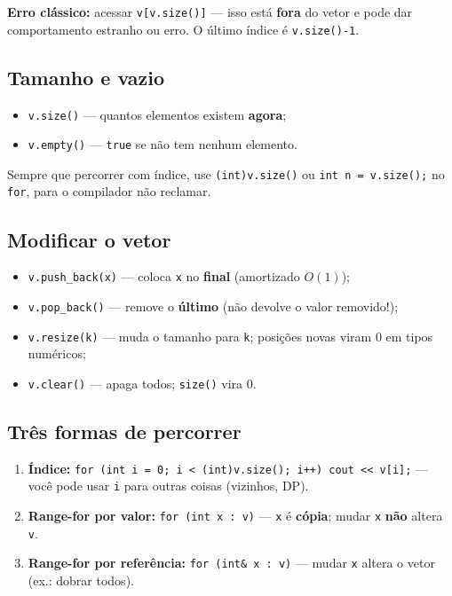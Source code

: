 \textbf{Erro clássico:} acessar \texttt{v[v.size()]} --- isso está \textbf{fora} do vetor e pode dar comportamento estranho ou erro. O último índice é \texttt{v.size()-1}.

\subsection{Tamanho e vazio}

\begin{itemize}[nosep]
  \item \texttt{v.size()} --- quantos elementos existem \textbf{agora};
  \item \texttt{v.empty()} --- \texttt{true} se não tem nenhum elemento.
\end{itemize}

Sempre que percorrer com índice, use \texttt{(int)v.size()} ou \texttt{int n = v.size();} no \texttt{for}, para o compilador não reclamar.

\subsection{Modificar o vetor}

\begin{itemize}[nosep]
  \item \texttt{v.push\_back(x)} --- coloca \texttt{x} no \textbf{final} (amortizado $O(1)$);
  \item \texttt{v.pop\_back()} --- remove o \textbf{último} (não devolve o valor removido!);
  \item \texttt{v.resize(k)} --- muda o tamanho para \texttt{k}; posições novas viram 0 em tipos numéricos;
  \item \texttt{v.clear()} --- apaga todos; \texttt{size()} vira 0.
\end{itemize}

\subsection{Três formas de percorrer}

\begin{enumerate}[nosep]
  \item \textbf{Índice:} \texttt{for (int i = 0; i < (int)v.size(); i++) cout << v[i];} --- você pode usar \texttt{i} para outras coisas (vizinhos, DP).
  \item \textbf{Range-for por valor:} \texttt{for (int x : v)} --- \texttt{x} é \textbf{cópia}; mudar \texttt{x} \textbf{não} altera \texttt{v}.
  \item \textbf{Range-for por referência:} \texttt{for (int\& x : v)} --- mudar \texttt{x} altera o vetor (ex.: dobrar todos).
\end{enumerate}


